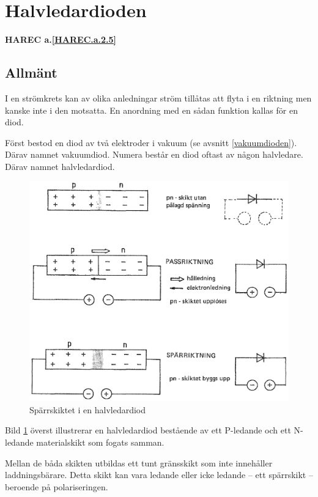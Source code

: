 \section{Halvledardioden}
\textbf{HAREC a.\ref{HAREC.a.2.5}\label{myHAREC.a.2.5}}

\subsection{Allmänt}
I en strömkrets kan av olika anledningar ström tillåtas att flyta i en riktning
men kanske inte i den motsatta. En anordning med en sådan funktion kallas för
en diod.

Först bestod en diod av två elektroder i vakuum (se avsnitt
\ref{vakuumdioden}). Därav namnet vakuumdiod.
Numera består en diod oftast av någon halvledare. Därav namnet halvledardiod.

\begin{figure}
\includegraphics[width=\textwidth]{images/cropped_pdfs/bild_2_2-12.pdf}
\caption{Spärrskiktet i en halvledardiod}
\label{fig:BildII2-12}
\end{figure}

Bild \ref{fig:BildII2-12} överst illustrerar en halvledardiod bestående av ett
P-ledande och ett N-ledande materialskikt som fogats samman.

Mellan de båda skikten utbildas ett tunt gränsskikt som inte innehåller
laddningsbärare. Detta skikt kan vara ledande eller icke ledande -- ett
spärrskikt -- beroende på polariseringen.


